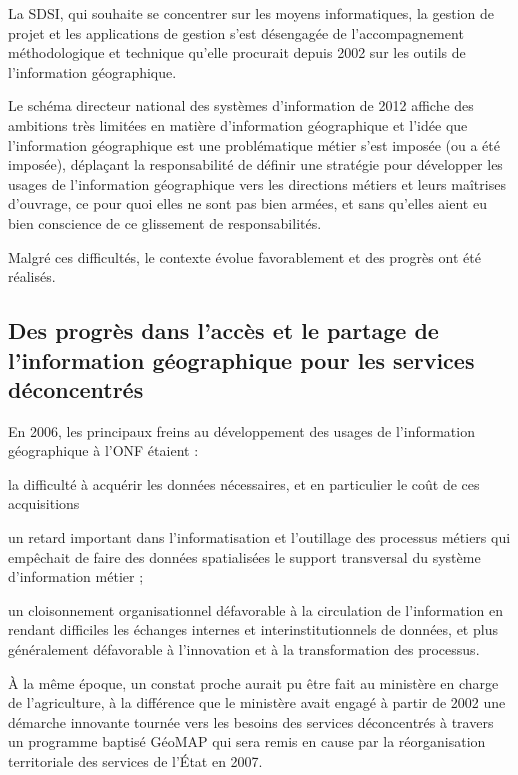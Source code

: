 La SDSI, qui souhaite se concentrer sur les moyens informatiques,
la gestion de projet et les applications de gestion
s'est désengagée de l'accompagnement méthodologique et technique
qu'elle procurait depuis 2002 sur les outils de l'information géographique.

Le schéma directeur national des systèmes d'information de 2012
affiche des ambitions très limitées en matière d'information géographique
et l'idée que l'information géographique est une problématique
métier s'est imposée (ou a été imposée),
déplaçant la responsabilité de définir une stratégie
pour développer les usages de l'information géographique
vers les directions métiers et leurs maîtrises d'ouvrage,
ce pour quoi elles ne sont pas bien armées,
et sans qu'elles aient eu bien conscience de ce glissement de responsabilités.

Malgré ces difficultés, le contexte évolue favorablement
et des progrès ont été réalisés.


\subsection[constats:progres]
{Des progrès dans l'accès et le partage de l'information géographique pour les
services déconcentrés}


En 2006, les principaux freins au développement
des usages de l'information géographique à l'ONF étaient :

\startitemize

\item la difficulté à acquérir les données nécessaires,
      et en particulier le coût de ces acquisitions

\item un retard important dans l'informatisation et l'outillage
      des processus métiers qui empêchait de faire
      des données spatialisées le support transversal
      du système d'information métier ;

\item un cloisonnement organisationnel défavorable
      à la circulation de l'information en rendant difficiles
      les échanges internes et interinstitutionnels de
      données, et plus généralement défavorable à l'innovation et
      à la transformation des processus.

\stopitemize

À la même époque, un constat proche aurait pu être fait au ministère
en charge de l'agriculture, à la différence que le ministère avait
engagé à partir de 2002 une démarche innovante tournée vers les besoins
des services déconcentrés à travers un programme baptisé GéoMAP
qui sera remis en cause par la réorganisation territoriale des
services de l'État en 2007.

